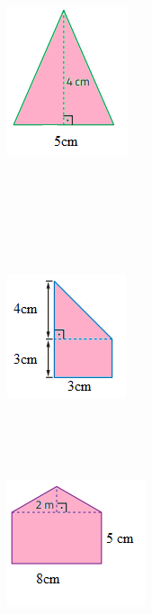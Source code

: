 \item
\begin{figure}[H]
\centering\includegraphics[width=1.39583in,height=1.72917in]{./imgSAEB_8_MAT/media/image47.png}
\end{figure}

\\
\\
\\
\\
\reduline{ \hfill}\\
\item
\begin{figure}[H]
\centering\includegraphics[width=1.375in,height=1.42708in]{./imgSAEB_8_MAT/media/image48.png}
\end{figure}

\\
\\
\\

\item
\begin{figure}[H]
\centering\includegraphics[width=1.59375in,height=1.46875in]{./imgSAEB_8_MAT/media/image49.png}
\end{figure}

